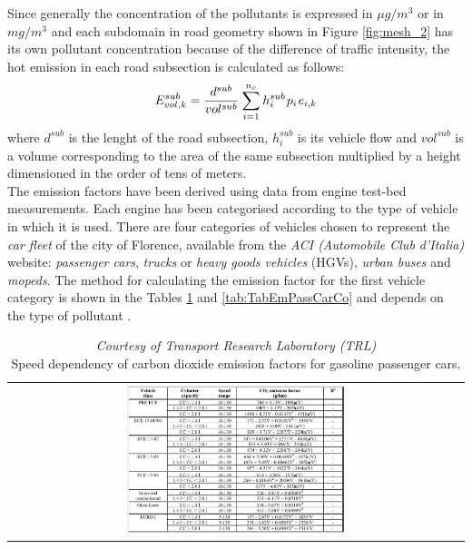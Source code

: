 \documentclass[journal]{IEEEtran}
\newcommand{\be}{\begin{equation}}
\newcommand{\ee}{\end{equation}}
\begin{document}
Since generally the concentration of the pollutants is expressed in $\mu g/m^3$ or in $mg/m^3$ and each subdomain in road geometry shown in Figure \ref{fig:mesh_2} has its own pollutant concentration because of the difference of traffic intensity, the hot emission in each road subsection is calculated as follows:
\be \label{eq:authorknow}
E_{vol,k}^{sub} = \dfrac{d^{sub}}{vol^{sub}}\hspace{0.3mm} \sum\limits_{i=1}^{n_c}\hspace{0.1mm} h_{i}^{sub}\hspace{0.3mm}  p_{i}\hspace{0.3mm} e_{i,k}
\ee
where $d^{sub}$ is the lenght of the road subsection, $h_{i}^{sub}$  is its vehicle flow and $vol^{sub}$ is a volume corresponding to the area of the same subsection multiplied by a height dimensioned in the order of tens of meters. \\
The emission factors have been derived using data from engine test-bed measurements. Each engine has been
categorised according to the type of vehicle in which it is used. There are four categories of vehicles chosen to represent the \textit{car fleet} of the city of Florence, available from the \textit{ACI (Automobile Club d'Italia)} website: \textit{passenger cars}, \textit{trucks} or \textit{heavy goods vehicles} (HGVs), \textit{urban buses} and \textit{mopeds}.
The method for calculating the emission factor for the first vehicle category is shown in the Tables \ref{tab:speed_dep_gpassengercars} and \ref{tab:TabEmPassCarCo} and depends on the type of pollutant \cite{bib:MEET001}.
\begin{table}[tbp]
 \centering
 \begin{center}  
  \begin{tabular}{c}
\hspace{-3.5mm}      \includegraphics[width=0.5\textwidth]{figure/Emission_passvehicle_co2.jpg} 
  \end{tabular}
\end{center}  
\caption{\textit{Courtesy of Transport Research Laboratory (TRL)} \cite{bib:MEET001}\\Speed dependency of carbon dioxide emission factors for gasoline passenger cars.}
  \label{tab:speed_dep_gpassengercars}
\end{table}
\end{document}
